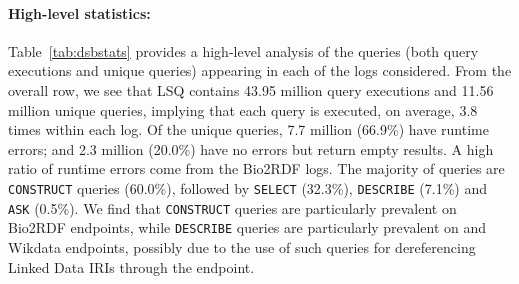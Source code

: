 
\paragraph{High-level statistics:} Table~\ref{tab:dsbstats} provides a high-level analysis of the queries (both query executions and unique queries) appearing in each of the logs considered. From the overall row, we see that LSQ contains 43.95 million query executions and 11.56 million unique queries, implying that each query is executed, on average, 3.8 times within each log. Of the unique queries, 7.7 million (66.9\%) have runtime errors; and 2.3 million (20.0\%) have no errors but return empty results. A high ratio of runtime errors come from the Bio2RDF logs. The majority of queries are \texttt{CONSTRUCT} queries (60.0\%), followed by \texttt{SELECT} (32.3\%), \texttt{DESCRIBE} (7.1\%) and \texttt{ASK} (0.5\%). We find that \texttt{CONSTRUCT} queries are particularly prevalent on Bio2RDF endpoints, while \texttt{DESCRIBE} queries are particularly prevalent on \dbpedia and Wikdata endpoints, possibly due to the use of such queries for dereferencing Linked Data IRIs through the endpoint.

